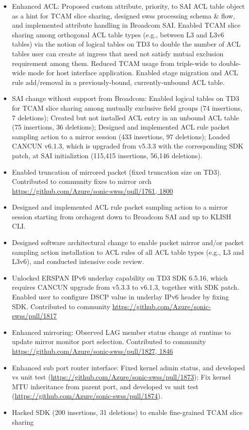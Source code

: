\documentclass[letterpaper,11pt]{article}
\newcommand{\resitem}[1]{\item #1 \vspace{-2pt}}
\begin{document}
\begin{CJK}{UTF8}{gbsn}
\begin{itemize}
\begin{itemize}
  \resitem{Enhanced ACL:
  Proposed custom attribute, priority, to SAI ACL table object as a hint for TCAM slice sharing, designed swss processing schema \& flow,
  and implemented attribute handling in Broadcom SAI.
  Enabled TCAM slice sharing among orthogonal ACL table types (e.g., between L3 and L3v6 tables)
  via the notion of logical tables on TD3 to double the number of ACL tables user can create at ingress that
  need not satisfy mutual exclusion requirement among them.
  Reduced TCAM usage from triple-wide to double-wide mode for host interface application.
  Enabled stage migration and ACL rule add/removal in a previously-bound, currently-unbound ACL table.}
  \resitem{SAI change without support from Broadcom:
  Enabled logical tables on TD3 for TCAM slice sharing among mutually exclusive field groups (74 insertions, 7 deletions);
  Created but not installed ACL entry in an unbound ACL table (75 insertions, 36 deletions);
  Designed and implemented ACL rule packet sampling action to a mirror session (433 insertions, 97 deletions);
  Loaded CANCUN v6.1.3, which is upgraded from v5.3.3 with the corresponding SDK patch, at SAI initializtion (115,415 insertions, 56,146 deletions).}
  \resitem{Enabled truncation of mirrored packet (fixed truncation size on TD3).
  Contributed to community fixes to mirror orch \url{https://github.com/Azure/sonic-swss/pull/1761, 1800}}
  \resitem{Designed and implemented ACL rule packet sampling action to a mirror session starting from orchagent down to Broadcom SAI and up to KLISH CLI.}
  \resitem{Designed software architectural change to enable packet mirror and/or packet sampling action installation
  to ACL rules of all ACL table types (e.g., L3 and L3v6), and conducted intensive code review.}
  \resitem{Unlocked ERSPAN IPv6 underlay capability on TD3 SDK 6.5.16, which requires CANCUN upgrade from v5.3.3 to v6.1.3, together with SDK patch.
  Enabled user to configure DSCP value in underlay IPv6 header by fixing SDK. Contributed to community \url{https://github.com/Azure/sonic-swss/pull/1817}}
  \resitem{Enhanced mirroring: Observed LAG member status change at runtime to update mirror monitor port selection.
  Contributed to community \url{https://github.com/Azure/sonic-swss/pull/1827, 1846}}
  \resitem{Enhanced sub port router interface: Fixed kernel admin status, and developed vs unit test
  (\url{https://github.com/Azure/sonic-swss/pull/1873});
  Fix kernel MTU inheritance from parent port, and developed vs unit test
  (\url{https://github.com/Azure/sonic-swss/pull/1874}).}
  \resitem{Hacked SDK (200 insertions, 31 deletions) to enable fine-grained TCAM slice sharing
}
\end{itemize}
\end{itemize}
\end{CJK}
\end{document}
